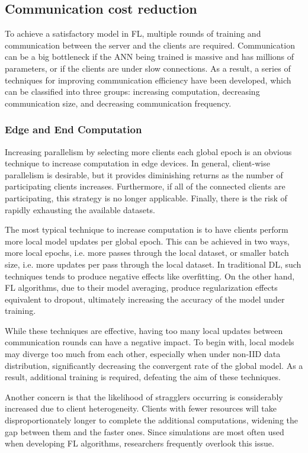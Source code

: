 \subsection{Communication cost reduction}
To achieve a satisfactory model in FL, multiple rounds of training and communication between the server and the clients are required. Communication can be a big bottleneck if the ANN being trained is massive and has millions of parameters, or if the clients are under slow connections. As a result, a series of techniques for improving communication efficiency have been developed, which can be classified into three groups: increasing computation, decreasing communication size, and decreasing communication frequency.

\subsubsection{Edge and End Computation}
Increasing parallelism by selecting more clients each global epoch is an obvious technique to increase computation in edge devices. In general, client-wise parallelism is desirable, but it provides diminishing returns as the number of participating clients increases. Furthermore, if all of the connected clients are participating, this strategy is no longer applicable. Finally, there is the risk of rapidly exhausting the available datasets.

The most typical technique to increase computation is to have clients perform more local model updates per global epoch. This can be achieved in two ways, more local epochs, i.e. more passes through the local dataset, or smaller batch size, i.e. more updates per pass through the local dataset. In traditional DL, such techniques tends to produce negative effects like overfitting. On the other hand, FL algorithms, due to their model averaging, produce regularization effects equivalent to dropout, ultimately increasing the accuracy of the model under training.

While these techniques are effective, having too many local updates between communication rounds can have a negative impact. To begin with, local models may diverge too much from each other, especially when under non-IID data distribution, significantly decreasing the convergent rate of the global model. As a result, additional training is required, defeating the aim of these techniques.

Another concern is that the likelihood of stragglers occurring is considerably increased due to client heterogeneity. Clients with fewer resources will take disproportionately longer to complete the additional computations, widening the gap between them and the faster ones. Since simulations are most often used when developing FL algorithms, researchers frequently overlook this issue.

